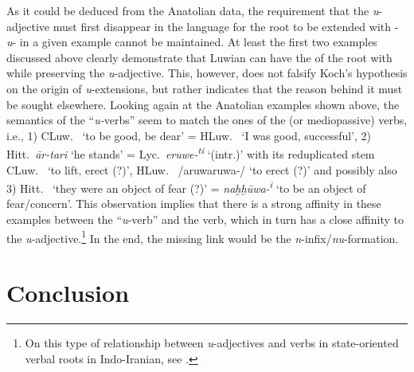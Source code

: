 \documentclass[output=paper,colorlinks,citecolor=brown]{langscibook}
\begin{document}
As it could be deduced from the Anatolian data, the requirement that the \textit{u}-adjective must first disappear in the language for the root to be extended with -\textit{u}- in a given example cannot be maintained. At least the first two examples discussed above clearly demonstrate that Luwian can have the  of the root with  while preserving the \textit{u}-adjective. This, however, does not falsify Koch’s hypothesis on the origin of \textit{u}-extensions, but rather indicates that the reason behind it must be sought elsewhere. Looking again at the Anatolian examples shown above, the semantics of the “\textit{u\nobreakdash-}verbs” seem to match the ones of the  (or mediopassive) verbs, i.e., 1) CLuw.\  ‘to be good, be dear’ = HLuw.\  ‘I was good, successful’, 2) Hitt.\ \textit{ār-tari} ‘he stands’ = Lyc.\ \textit{eruwe-\textsuperscript{ti}} ‘(intr.)’ with its  reduplicated stem CLuw.\  ‘to lift, erect (?)’, HLuw.\  /aruwaruwa-/ ‘to erect (?)’ and possibly also 3) Hitt.\  ‘they were an object of fear (?)’ = \textit{naḫḫūwa-\textsuperscript{i}} ‘to be an object of fear/concern’. This observation implies that there is a strong affinity in these examples between the “\textit{u}-verb” and the  verb, which in turn has a close affinity to the \textit{u}-adjective.\footnote{On this type of relationship  between \textit{u}-adjectives and  verbs in state-oriented verbal roots in Indo-Iranian, see \citealt{Rau2013}.} In the end, the missing link would be the \textit{n}-infix/\textit{nu}-formation.

\section{Conclusion}
\end{document}
